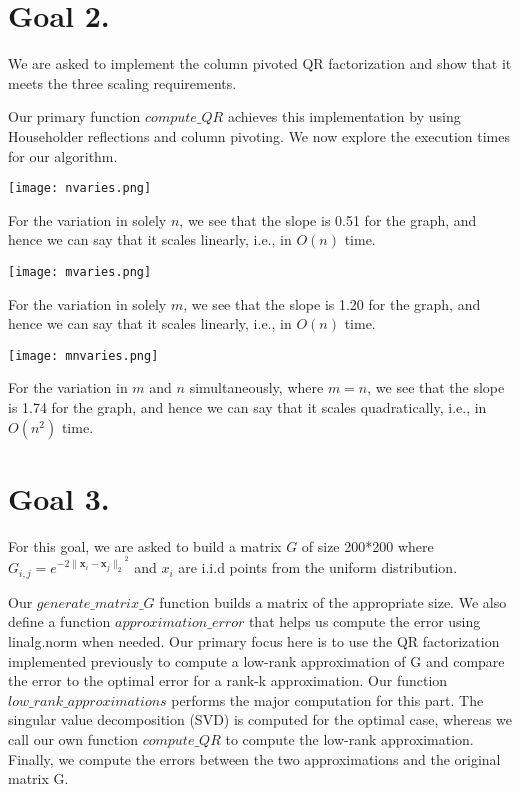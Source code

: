 \documentclass[12pt]{article}
\begin{document}
\section*{Goal 2.}
We are asked to implement the column pivoted QR factorization and show that it meets the three scaling requirements.

Our primary function $compute\_QR$ achieves this implementation by using Householder reflections and column pivoting. We now explore the execution times for our algorithm.

\begin{center}
    \texttt{[image: nvaries.png]}
\end{center}
For the variation in solely $n$, we see that the slope is 0.51 for the graph, and hence we can say that it scales linearly, i.e., in $O(n)$ time.

\begin{center}
    \texttt{[image: mvaries.png]}
\end{center}
For the variation in solely $m$, we see that the slope is 1.20 for the graph, and hence we can say that it scales linearly, i.e., in $O(n)$ time.

\begin{center}
    \texttt{[image: mnvaries.png]}
\end{center}
For the variation in $m$ and $n$ simultaneously, where $m=n$, we see that the slope is 1.74 for the graph, and hence we can say that it scales quadratically, i.e., in $O(n^2)$ time.

\section*{Goal 3.}
For this goal, we are asked to build a matrix $G$ of size 200*200 where $G_{i,j} = e^{-2{\|\mathbf{x}_i - \mathbf{x}_j\|_2}^2}$ and $x_i$ are i.i.d points from the uniform distribution.

Our $generate\_matrix\_G$ function builds a matrix of the appropriate size. We also define a function $approximation\_error$ that helps us compute the error using linalg.norm when needed. 
Our primary focus here is to use the QR factorization implemented previously to compute a low-rank approximation of G and compare the error to the optimal error for a rank-k approximation. Our function $low\_rank\_approximations$ performs the major computation for this part. The singular value decomposition (SVD) is computed for the optimal case, whereas we call our own function $compute\_QR$ to compute the low-rank approximation. Finally, we compute the errors between the two approximations and the original matrix G.
\end{document}
